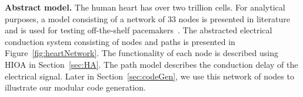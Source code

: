 \noindent \textbf{Abstract model.}  The human heart has over two
trillion cells. For analytical purposes, a model consisting of a network
of $33$ nodes is presented in literature and is used for testing
off-the-shelf pacemakers~\cite{chen14,zhihao12}.  The abstracted
electrical conduction system consisting of nodes and paths is presented
in Figure~\ref{fig:heartNetwork}.  The functionality of each node is
described using \acf{HIOA} in Section~\ref{sec:HA}. The path model
describes the conduction delay of the electrical signal.  Later in
Section~\ref{sec:codeGen}, we use this network of nodes to illustrate
our modular code generation.

 


